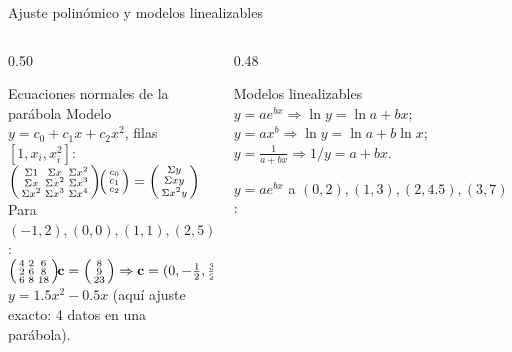 \documentclass[aspectratio=169,10pt]{beamer}
\begin{document}
\begin{frame}{Ajuste polinómico y modelos linealizables}
\begin{columns}[T]
\begin{column}{0.50\textwidth}
\begin{cardgear}{Ecuaciones normales de la parábola}{\faCalculator}
{\footnotesize Modelo $y=c_0+c_1x+c_2x^2$, filas $[1,x_i,x_i^2]$:\\[1.0mm]
$\begin{psmallmatrix}\Sigma1&\Sigma x&\Sigma x^2\\ \Sigma x&\Sigma x^2&\Sigma x^3\\ \Sigma x^2&\Sigma x^3&\Sigma x^4\end{psmallmatrix}\!\begin{psmallmatrix}c_0\\ c_1\\ c_2\end{psmallmatrix}=\begin{psmallmatrix}\Sigma y\\ \Sigma xy\\ \Sigma x^2y\end{psmallmatrix}$\\[1.6mm]
Para $(-1,2),(0,0),(1,1),(2,5)$:\\[0.6mm]
$\begin{psmallmatrix}4&2&6\\ 2&6&8\\ 6&8&18\end{psmallmatrix}\!\mathbf c=\begin{psmallmatrix}8\\ 9\\ 23\end{psmallmatrix}\Rightarrow \mathbf c=(0,-\tfrac12,\tfrac32)^{\!\top}$\\[0.8mm]
$y=1.5x^2-0.5x$ (aquí ajuste exacto: 4 datos en una parábola).}
\end{cardgear}
\end{column}
\begin{column}{0.48\textwidth}
\begin{cardidea}{Modelos linealizables}{\faSuperscript}
{\footnotesize $y=ae^{bx}\Rightarrow \ln y=\ln a+bx$;\; $y=ax^b\Rightarrow \ln y=\ln a+b\ln x$;\; $y=\tfrac{1}{a+bx}\Rightarrow 1/y=a+bx$.}
\end{cardidea}
\vspace{1mm}
\begin{cardnota}[\faTable]
\centering
{\footnotesize $y=ae^{bx}$ a $(0,2),(1,3),(2,4.5),(3,7)$:\\[0.8mm]
}
\end{cardnota}
\end{column}
\end{columns}
\end{frame}
\end{document}
